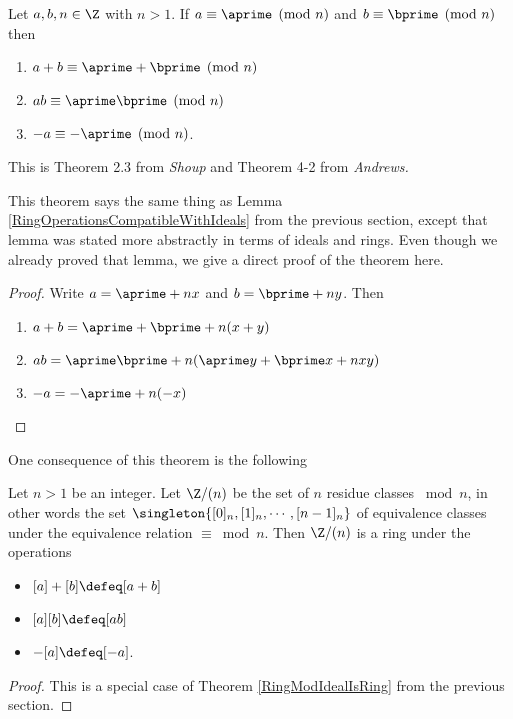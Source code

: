 \documentclass[oneside,12pt]{amsart}
\begin{document}
\begin{theorem}
\label{ArithmeticCompatibleWithCongruence}
Let $a,b,n\in\Z$ with $n>1$. If $a\equiv\aprime \pmod n$ and $b\equiv\bprime \pmod n$ then
\begin{enumerate}
\item $a+b\equiv \aprime + \bprime \pmod n$
\item $ab \equiv \aprime\bprime \pmod n$
\item $-a \equiv -\aprime \pmod n$.
\end{enumerate}
\end{theorem}

\begin{note}
This is Theorem 2.3 from \emph{Shoup} and Theorem 4-2 from \emph{Andrews.}

This theorem says the same thing as Lemma \ref{RingOperationsCompatibleWithIdeals} from the previous section,
except that lemma was stated more abstractly in terms of ideals and rings. Even though we already proved
that lemma, we give a direct proof of the theorem here.
\end{note}

\begin{proof}
Write $a=\aprime + nx$ and $b=\bprime + ny$. Then
\begin{enumerate}
\item $a+b = \aprime + \bprime + n(x+y)$
\item $ab = \aprime\bprime + n(\aprime y + \bprime x + nxy)$
\item $-a = -\aprime + n(-x)$
\end{enumerate}
\end{proof}

One consequence of this theorem is the following 

\begin{theorem}
Let $n>1$ be an integer. Let $\Z/(n)$ be the set of $n$ residue classes $\bmod n$,
in other words the set  $\singleton{[0]_n,[1]_n,\cdots,[n-1]_n}$ of equivalence classes
under the equivalence relation $\equiv \bmod n$. Then $\Z/(n)$ is a ring under the operations
\begin{itemize}
\item $[a] + [b] \defeq [a+b]$
\item $[a][b] \defeq [ab]$
\item $-[a] \defeq [-a]$.
\end{itemize}
\end{theorem}
\begin{proof}
This is a special case of Theorem \ref{RingModIdealIsRing} from the previous section.
\end{proof}
\end{document}
